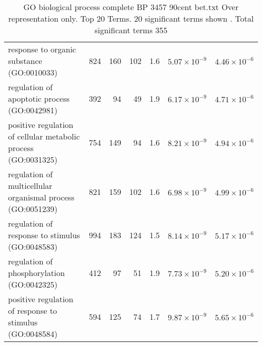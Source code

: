 \begin{table}[ht]
\begin{adjustbox}{width=\textwidth}
\begin{tabular}{lrrrrrr}
  response to organic substance (GO:0010033) & 824 & 160 & 102 & 1.6 & $5.07 \times 10^{-9}$ & $4.46 \times 10^{-6}$ \\ 
  regulation of apoptotic process (GO:0042981) & 392 & 94 & 49 & 1.9 & $6.17 \times 10^{-9}$ & $4.71 \times 10^{-6}$ \\ 
  positive regulation of cellular metabolic process (GO:0031325) & 754 & 149 & 94 & 1.6 & $8.21 \times 10^{-9}$ & $4.94 \times 10^{-6}$ \\ 
  regulation of multicellular organismal process (GO:0051239) & 821 & 159 & 102 & 1.6 & $6.98 \times 10^{-9}$ & $4.99 \times 10^{-6}$ \\ 
  regulation of response to stimulus (GO:0048583) & 994 & 183 & 124 & 1.5 & $8.14 \times 10^{-9}$ & $5.17 \times 10^{-6}$ \\ 
  regulation of phosphorylation (GO:0042325) & 412 & 97 & 51 & 1.9 & $7.73 \times 10^{-9}$ & $5.20 \times 10^{-6}$ \\ 
  positive regulation of response to stimulus (GO:0048584) & 594 & 125 & 74 & 1.7 & $9.87 \times 10^{-9}$ & $5.65 \times 10^{-6}$ \\ 
   \hline
\end{tabular}
\end{adjustbox}
\caption{GO biological process complete BP 3457 90cent bet.txt Over representation only. Top 20 Terms. 20 significant terms shown . Total significant terms 355} 
\label{tab:GO biological process complete BP 3457 90cent bet.txt Over representation only. Top 20 Terms. 20 significant terms shown . Total significant terms 355}
\end{table}


